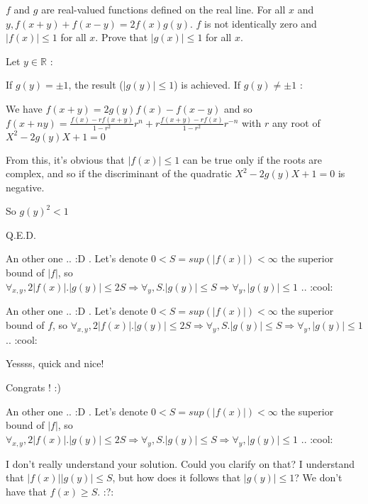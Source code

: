 \begin{solution}
	\begin{tcolorbox}$ f$ and $ g$ are real-valued functions defined on the real line. For all $ x$ and $ y, f(x + y) + f(x - y) = 2f(x)g(y)$. $ f$ is not identically zero and $ |f(x)|\le1$ for all $ x$. Prove that $ |g(x)|\le1$ for all $ x$.\end{tcolorbox}

Let $ y\in\mathbb R$ :

If $ g(y)=\pm 1$, the result ($ |g(y)|\leq 1$) is achieved.
If $ g(y)\neq \pm 1$ :

We have $ f(x+y)=2g(y)f(x)-f(x-y)$ and so $ f(x+ny)=\frac{f(x)-rf(x+y)}{1-r^2}r^n+r\frac{f(x+y)-rf(x)}{1-r^2}r^{-n}$ with $ r$ any root of $ X^2-2g(y)X+1=0$

From this, it's obvious that $ |f(x)|\leq 1$ can be true only if the roots are complex, and so if the discriminant of the quadratic $ X^2-2g(y)X+1=0$ is negative.

So $ g(y)^2< 1$

Q.E.D.
\end{solution}



\begin{solution}
	An other one ..  :D . Let's denote $ 0 < S = sup(|f(x)|) < \infty$ the superior bound of $ |f|$, so 
$ \forall_{x,y} ,2|f(x)|.|g(y) |\leq 2S \Longrightarrow \forall_y, S.|g(y)|\leq S \Longrightarrow \forall_y ,|g(y)|\leq 1$ ..  :cool:
\end{solution}



\begin{solution}
	\begin{tcolorbox}An other one ..  :D . Let's denote $ 0 < S = sup(|f(x)|) < \infty$ the superior bound of $ f$, so 
$ \forall_{x,y} ,2|f(x)|.|g(y) |\leq 2S \Longrightarrow \forall_y, S.|g(y)|\leq S \Longrightarrow \forall_y ,|g(y)|\leq 1$ ..  :cool:\end{tcolorbox}

Yessss, quick and nice!

Congrats !   :)
\end{solution}



\begin{solution}
	\begin{tcolorbox}An other one ..  :D . Let's denote $ 0 < S = sup(|f(x)|) < \infty$ the superior bound of $ |f|$, so 
$ \forall_{x,y} ,2|f(x)|.|g(y) |\leq 2S \Longrightarrow \forall_y, S.|g(y)|\leq S \Longrightarrow \forall_y ,|g(y)|\leq 1$ ..  :cool:\end{tcolorbox}
I don't really understand your solution. Could you clarify on that? I understand that $ |f(x)| |g(y)| \leq S$, but how does it follows that $ |g(y)| \leq 1$? We don't have that $ f(x) \geq S$.  :?:
\end{solution}



